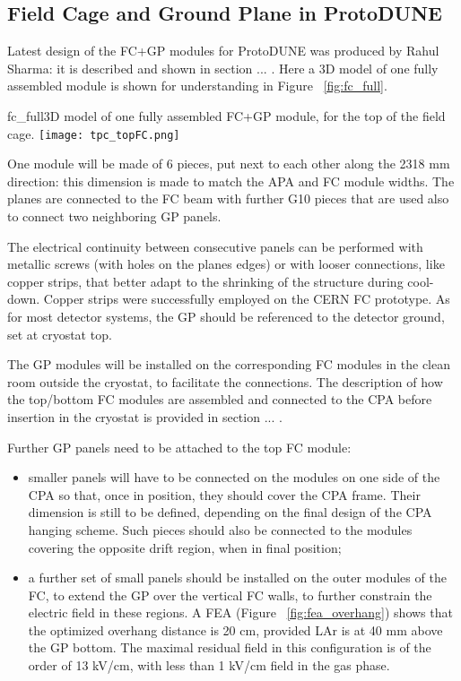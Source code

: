 \subsection{Field Cage and Ground Plane in ProtoDUNE}

Latest design of the FC+GP modules for ProtoDUNE was produced by Rahul Sharma: it is described and shown in section ... . Here a 3D model of one fully assembled module is shown for understanding in Figure ~\ref{fig:fc_full}.

\begin{cdrfigure}{fc_full}{3D model of one fully assembled FC+GP module, for the top of the field cage. }
\texttt{[image: tpc\_topFC.png]}
\end{cdrfigure}

One module will be made of 6 pieces, put next to each other along the 2318 mm direction: this dimension is made to match the APA and FC module widths. The planes are connected to the FC beam with further G10 pieces that are used also to connect two neighboring GP panels.

The electrical continuity between consecutive panels can be performed with metallic screws (with holes on the planes edges) or with looser connections, like copper strips, that better adapt to the shrinking of the structure during cool-down. Copper strips were successfully employed on the CERN FC prototype.
As for most detector systems, the GP should be referenced to the detector ground, set at cryostat top.

The GP modules will be installed on the corresponding FC modules in the clean room outside the cryostat, to facilitate the connections. The description of how the top/bottom FC modules are assembled and connected to the CPA before insertion in the cryostat is provided in section ... .

Further GP panels need to be attached to the top FC module:
\begin{itemize}
\item smaller panels will have to be connected on the modules on one side of the CPA so that, once in position, they should cover the CPA frame. Their dimension is still to be defined, depending on the final design of the CPA hanging scheme. Such pieces should also be connected to the modules covering the opposite drift region, when in final position;
\item a further set of small panels should be installed on the outer modules of the FC, to extend the GP over the vertical FC walls, to further constrain the electric field in these regions. A FEA (Figure ~\ref{fig:fea_overhang}) shows that the optimized overhang distance is 20 cm, provided LAr is at 40 mm above the GP bottom. The maximal residual field in this configuration is of the order of 13 kV/cm, with less than 1 kV/cm field in the gas phase.
\end{itemize}

